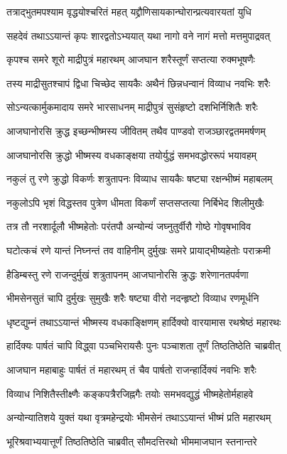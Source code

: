 \twolineshloka
{तत्राद्भुतमपश्याम वृद्धयोश्चरितं महत्}
{यद्द्रौणिसायकान्घोरान्प्रत्यवारयतां युधि}


\twolineshloka
{सहदेवं तथाऽऽयान्तं कृपः शारद्वतोऽभ्ययात्}
{यथा नागो वने नागं मत्तो मत्तमुपाद्रवत्}


\twolineshloka
{कृपश्च समरे शूरो माद्रीपुत्रं महारथम्}
{आजघान शरैस्तूर्णं सप्तत्या रुक्मभूषणैः}


\twolineshloka
{तस्य माद्रीसुतश्चापं द्विधा चिच्छेद सायकैः}
{अथैनं छिन्नधन्वानं विव्याध नवभिः शरैः}


\twolineshloka
{सोऽन्यत्कार्मुकमादाय समरे भारसाधनम्}
{माद्रीपुत्रं सुसंहृष्टो दशभिर्निशितैः शरैः}


\twolineshloka
{आजघानोरसि क्रुद्ध इच्छन्भीष्मस्य जीवितम्}
{तथैव पाण्डवो राजञ्छारद्वतममर्षणम्}


\twolineshloka
{आजघानोरसि क्रुद्धो भीष्मस्य वधकाङ्क्षया}
{तयोर्युद्धं समभवद्धोररूपं भयावहम्}


\twolineshloka
{नकुलं तु रणे क्रुद्धो विकर्णः शत्रुतापनः}
{विव्याध सायकैः षष्ट्या रक्षन्भीष्मं महाबलम्}


\twolineshloka
{नकुलोऽपि भृशं विद्धस्तव पुत्रेण धीमता}
{विकर्णं सप्तसप्तत्या निर्बिभेद शिलीमुखैः}


\twolineshloka
{तत्र तौ नरशार्दूलौ भीष्महेतोः परंतपौ}
{अन्योन्यं जघ्नुतुर्वीरौ गोष्ठे गोवृषभाविव}


\twolineshloka
{घटोत्कचं रणे यान्तं निघ्नन्तं तव वाहिनीम्}
{दुर्मुखः समरे प्रायाद्भीष्यहेतोः पराक्रमी}


\twolineshloka
{हैडिम्बस्तु रणे राजन्दुर्मुखं शत्रुतापनम्}
{आजघानोरसि क्रुद्धः शरेणानतपर्वणा}


\twolineshloka
{भीमसेनसुतं चापि दुर्मुखः सुमुखैः शरैः}
{षष्ट्या वीरो नदन्हृष्टो विव्याध रणमूर्धनि}


\twolineshloka
{धृष्टद्युम्नं तथाऽऽयान्तं भीष्मस्य वधकाङ्क्षिणम्}
{हार्दिक्यो वारयामास रथश्रेष्ठं महारथः}


\twolineshloka
{हार्दिक्यः पार्षतं चापि विद्ध्वा पञ्चभिरायसैः}
{पुनः पञ्चाशता तूर्णं तिष्ठतिष्ठेति चाब्रवीत्}


\twolineshloka
{आजघान महाबाहुः पार्षतं तं महारथम्}
{तं चैव पार्षतो राजन्हार्दिक्यं नवभिः शरैः}


\twolineshloka
{विव्याध निशितैस्तीक्ष्णैः कङ्कपत्रैरजिह्नगैः}
{तयोः समभवद्युद्धं भीष्महेतोर्महाहवे}


\twolineshloka
{अन्योन्यातिशये युक्तं यथा वृत्रमहेन्द्रयोः}
{भीमसेनं तथाऽऽयान्तं भीष्मं प्रति महारथम्}


\twolineshloka
{भूरिश्रवाभ्ययात्तूर्णं तिष्ठतिष्ठेति चाब्रवीत्}
{सौमदत्तिरथो भीममाजघान स्तनान्तरे}


